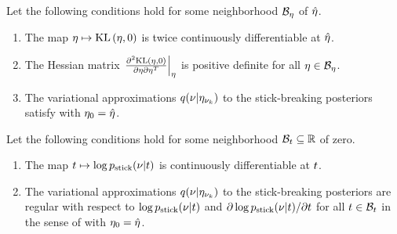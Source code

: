 \begin{assu}
%
Let the following conditions hold for some neighborhood $\mathcal{B}_\eta$
of $\hat\eta$.
%
\begin{enumerate}
%
    \item {} The map $\eta \mapsto \mathrm{KL}\left(\eta, 0\right)$ is twice
    continuously differentiable at $\hat\eta$.

    \item{} The Hessian matrix $\left.\frac{\partial^2 \mathrm{KL}\left(\eta,
    0\right)}{\partial \eta \partial \eta^T}\right\vert_{\eta}$ is positive definite for all
    $\eta \in \mathcal{B}_\eta$.

    \item{} The variational approximations $q(\nu
    \vert \eta_{\nu_{k}})$ to the stick-breaking posteriors satisfy 
    with $\eta_0 = \hat\eta$.
%
\end{enumerate}
%
\end{assu}

\begin{assu}
%
Let the following conditions hold for some neighborhood $\mathcal{B}_t \subseteq
\mathbb{R}$ of zero.
%
\begin{enumerate}
%
    \item {} The map $t \mapsto \log p_{\mathrm{stick}}(\nu \vert
    t)$ is continuously differentiable at $t$.

    \item{} The variational approximations $q(\nu
    \vert \eta_{\nu_{k}})$ to the stick-breaking posteriors are regular with respect to
    $\log p_{\mathrm{stick}}(\nu \vert t)$  and $\partial \log p_{\mathrm{stick}}(\nu \vert t) /
    \partial t$ for all $t \in \mathcal{B}_t$ in the sense of 
    with $\eta_0 = \hat\eta$.
%
\end{enumerate}
%
\end{assu}


